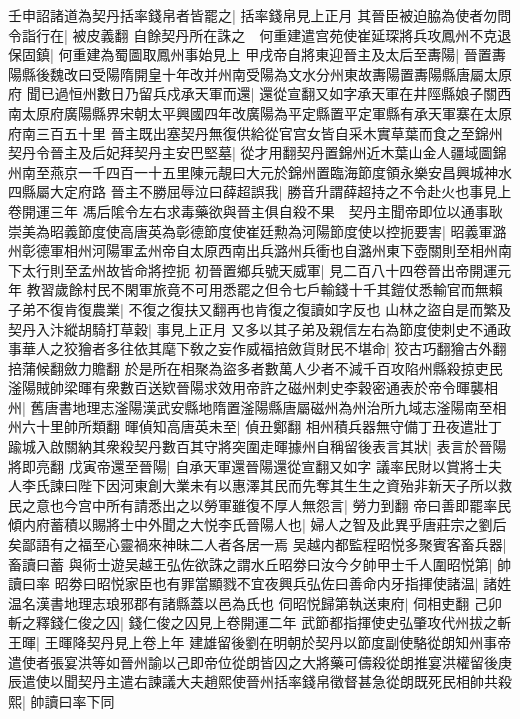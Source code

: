 壬申詔諸道為契丹括率錢帛者皆罷之|{
	括率錢帛見上正月}
其晉臣被迫脇為使者勿問令詣行在|{
	被皮義翻}
自餘契丹所在誅之　何重建遣宫苑使崔延琛將兵攻鳳州不克退保固鎮|{
	何重建為蜀圖取鳳州事始見上}
甲戌帝自將東迎晉主及太后至夀陽|{
	晉置夀陽縣後魏改曰受陽隋開皇十年改并州南受陽為文水分州東故夀陽置夀陽縣唐屬太原府}
聞已過恒州數日乃留兵戍承天軍而還|{
	還從宣翻又如字承天軍在井陘縣娘子關西南太原府廣陽縣界宋朝太平興國四年改廣陽為平定縣置平定軍縣有承天軍寨在太原府南三百五十里}
晉主既出塞契丹無復供給從官宫女皆自采木實草葉而食之至錦州契丹令晉主及后妃拜契丹主安巴堅墓|{
	從才用翻契丹置錦州近木葉山金人疆域圖錦州南至燕京一千四百一十五里陳元靚曰大元於錦州置臨海節度領永樂安昌興城神水四縣屬大定府路}
晉主不勝屈辱泣曰薛超誤我|{
	勝音升謂薛超持之不令赴火也事見上卷開運三年}
馮后隂令左右求毒藥欲與晉主俱自殺不果　契丹主聞帝即位以通事耿崇美為昭義節度使高唐英為彰德節度使崔廷勲為河陽節度使以控扼要害|{
	昭義軍潞州彰德軍相州河陽軍孟州帝自太原西南出兵潞州兵衝也自潞州東下壺關則至相州南下太行則至孟州故皆命將控扼}
初晉置鄉兵號天威軍|{
	見二百八十四卷晉出帝開運元年}
教習歲餘村民不閑軍旅竟不可用悉罷之但令七戶輸錢十千其鎧仗悉輸官而無賴子弟不復肯復農業|{
	不復之復扶又翻再也肯復之復讀如字反也}
山林之盜自是而繁及契丹入汴縱胡騎打草穀|{
	事見上正月}
又多以其子弟及親信左右為節度使刺史不通政事華人之狡獪者多往依其麾下敎之妄作威福掊斂貨財民不堪命|{
	狡古巧翻獪古外翻掊蒲候翻斂力贍翻}
於是所在相聚為盜多者數萬人少者不減千百攻陷州縣殺掠吏民滏陽賊帥梁暉有衆數百送欵晉陽求效用帝許之磁州刺史李穀密通表於帝令暉襲相州|{
	舊唐書地理志滏陽漢武安縣地隋置滏陽縣唐屬磁州為州治所九域志滏陽南至相州六十里帥所類翻}
暉偵知高唐英未至|{
	偵丑鄭翻}
相州積兵器無守備丁丑夜遣壯丁踰城入啟關納其衆殺契丹數百其守將突圍走暉據州自稱留後表言其狀|{
	表言於晉陽將即亮翻}
戊寅帝還至晉陽|{
	自承天軍還晉陽還從宣翻又如字}
議率民財以賞將士夫人李氏諫曰陛下因河東創大業未有以惠澤其民而先奪其生生之資殆非新天子所以救民之意也今宫中所有請悉出之以勞軍雖復不厚人無怨言|{
	勞力到翻}
帝曰善即罷率民傾内府蓄積以賜將士中外聞之大悦李氏晉陽人也|{
	婦人之智及此異乎唐莊宗之劉后矣鄙語有之福至心靈禍來神昧二人者各居一焉}
吴越内都監程昭悦多聚賓客畜兵器|{
	畜讀曰蓄}
與術士遊吴越王弘佐欲誅之謂水丘昭劵曰汝今夕帥甲士千人圍昭悦第|{
	帥讀曰率}
昭劵曰昭悦家臣也有罪當顯戮不宜夜興兵弘佐曰善命内牙指揮使諸温|{
	諸姓温名漢書地理志琅邪郡有諸縣蓋以邑為氏也}
伺昭悦歸第執送東府|{
	伺相吏翻}
己卯斬之釋錢仁俊之囚|{
	錢仁俊之囚見上卷開運二年}
武節都指揮使史弘肇攻代州拔之斬王暉|{
	王暉降契丹見上卷上年}
建雄留後劉在明朝於契丹以節度副使駱從朗知州事帝遣使者張宴洪等如晉州諭以己即帝位從朗皆囚之大將藥可儔殺從朗推宴洪權留後庚辰遣使以聞契丹主遣右諫議大夫趙熙使晉州括率錢帛徵督甚急從朗既死民相帥共殺熙|{
	帥讀曰率下同}
